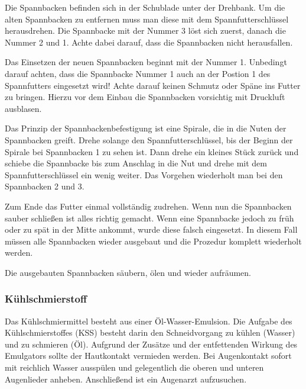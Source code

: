 \documentclass{\basedir/fablab-document}
\begin{document}
Die Spannbacken befinden sich in der Schublade unter der Drehbank.
Um die alten Spannbacken zu entfernen muss man diese mit dem Spannfutterschlüssel herausdrehen.
Die Spannbacke mit der Nummer 3 löst sich zuerst, danach die Nummer 2 und 1.
Achte dabei darauf, dass die Spannbacken nicht herausfallen.

Das Einsetzen der neuen Spannbacken beginnt mit der Nummer 1.
Unbedingt darauf achten, dass die Spannbacke Nummer 1 auch an der Postion 1 des Spannfutters eingesetzt wird!
Achte darauf keinen Schmutz oder Späne ins Futter zu bringen. Hierzu vor dem Einbau die Spannbacken vorsichtig mit Druckluft ausblasen.

Das Prinzip der Spannbackenbefestigung ist eine Spirale, die in die Nuten der Spannbacken greift.
Drehe solange den Spannfutterschlüssel, bis der Beginn der Spirale bei Spannbacken 1 zu sehen ist.
Dann drehe ein kleines Stück zurück und schiebe die Spannbacke bis zum Anschlag in die Nut und drehe mit dem Spannfutterschlüssel ein wenig weiter.
Das Vorgehen wiederholt man bei den Spannbacken 2 und 3.

Zum Ende das Futter einmal vollständig zudrehen.
Wenn nun die Spannbacken sauber schließen ist alles richtig gemacht.
Wenn eine Spannbacke jedoch zu früh oder zu spät in der Mitte ankommt, wurde diese falsch eingesetzt.
In diesem Fall müssen alle Spannbacken wieder ausgebaut und die Prozedur komplett wiederholt werden.

Die ausgebauten Spannbacken säubern, ölen und wieder aufräumen.

\subsubsection{Kühlschmierstoff}

Das Kühlschmiermittel besteht aus einer Öl-Wasser-Emulsion.
Die Aufgabe des Kühlschmierstoffes (KSS) besteht darin den Schneidvorgang zu kühlen (Wasser) und zu schmieren (Öl).
Aufgrund der Zusätze und der entfettenden Wirkung des Emulgators sollte der Hautkontakt vermieden werden.
Bei Augenkontakt sofort mit reichlich Wasser ausspülen und gelegentlich die oberen und unteren Augenlieder anheben.
Anschließend ist ein Augenarzt aufzusuchen.
\end{document}
